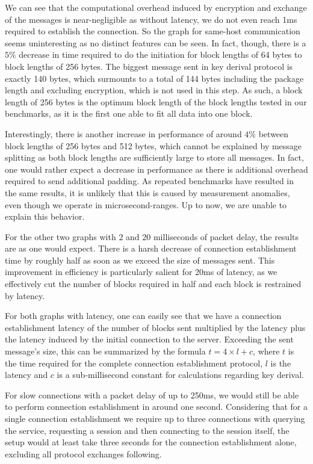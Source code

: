 We can see that the computational overhead induced by encryption and exchange of the messages is near-negligible as without latency, we do not even reach 1ms required to establish the connection.
So the graph for same-host communication seems uninteresting as no distinct features can be seen.
In fact, though, there is a $5\%$ decrease in time required to do the initiation for block lengths of 64 bytes to block lengths of 256 bytes.
The biggest message sent in key derival protocol is exactly 140 bytes, which surmounts to a total of 144 bytes including the package length and excluding encryption, which is not used in this step.
As such, a block length of 256 bytes is the optimum block length of the block lengths tested in our benchmarks, as it is the first one able to fit all data into one block.

Interestingly, there is another increase in performance of around $4\%$ between block lengths of 256 bytes and 512 bytes, which cannot be explained by message splitting as both block lengths are sufficiently large to store all messages.
In fact, one would rather expect a decrease in performance as there is additional overhead required to send additional padding.
As repeated benchmarks have resulted in the same results, it is unlikely that this is caused by measurement anomalies, even though we operate in microsecond-ranges.
Up to now, we are unable to explain this behavior.

For the other two graphs with 2 and 20 milliseconds of packet delay, the results are as one would expect.
There is a harsh decrease of connection establishment time by roughly half as soon as we exceed the size of messages sent.
This improvement in efficiency is particularly salient for 20ms of latency, as we effectively cut the number of blocks required in half and each block is restrained by latency.

For both graphs with latency, one can easily see that we have a connection establishment latency of the number of blocks sent multiplied by the latency plus the latency induced by the initial connection to the server.
Exceeding the sent message's size, this can be summarized by the formula $t = 4 \times l + c$, where $t$ is the time required for the complete connection establishment protocol, $l$ is the latency and $c$ is a sub-millisecond constant for calculations regarding key derival.

For slow connections with a packet delay of up to 250ms, we would still be able to perform connection establishment in around one second.
Considering that for a single connection establishment we require up to three connections with querying the service, requesting a session and then connecting to the session itself, the setup would at least take three seconds for the connection establishment alone, excluding all protocol exchanges following.

